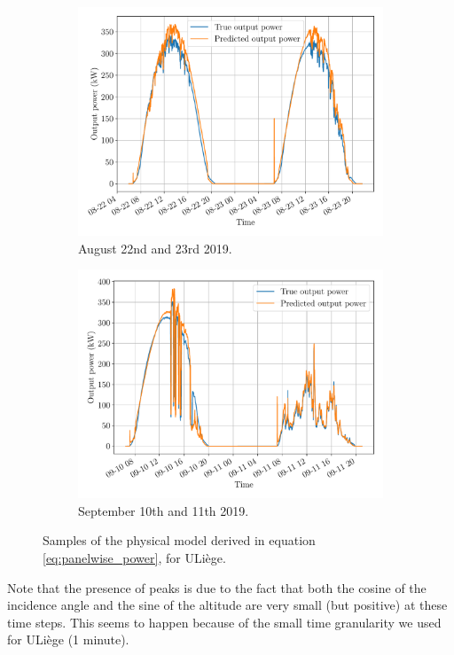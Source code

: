 \documentclass[a4paper, 12pt]{article}
\begin{document}
\begin{figure}[H]
	\centering
	\begin{subfigure}{0.48\textwidth}
		\centering
		\includegraphics[width=\textwidth]{resources/pdf/sart_tilman_22-08-2019.pdf}
		\vspace{-0.5em}
		\caption{August 22nd and 23rd 2019.}
		\label{fig:sart_tilman_1}
	\end{subfigure}
	\hspace{0.5em}
	\begin{subfigure}{0.48\textwidth}
		\centering
		\includegraphics[width=\textwidth]{resources/pdf/sart_tilman_10-09-2019.pdf}
		\vspace{-0.5em}
		\caption{September 10th and 11th 2019.}
		\label{fig:sart_tilman_2}
	\end{subfigure}
	\caption{Samples of the physical model derived in equation \ref{eq:panelwise_power}, for ULiège.}
	\label{fig:sart_tilman}
\end{figure}
Note that the presence of peaks is due to the fact that both the cosine of the incidence angle and the sine of the altitude are very small (but positive) at these time steps. This seems to happen because of the small time granularity we used for ULiège (1 minute).
\end{document}
